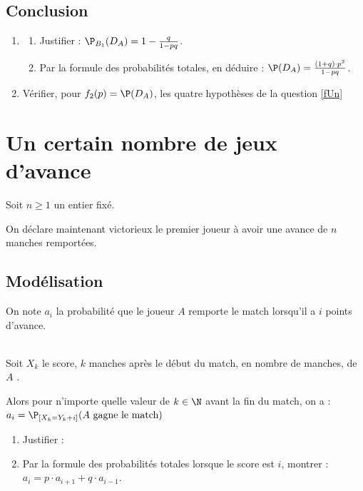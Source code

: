 \documentclass[12pt]{article}
\begin{document}
\subsection{Conclusion}
\begin{enumerate}[resume]
  \item
    \begin{enumerate}
      \item Justifier : \quad $\P_{B_1}(D_{A}) = 1-\frac{q}{1-pq}$.
      \item Par la formule des probabilités totales, en déduire : \quad $\P(D_{A}) = \frac{(1+q)\cdot p^2}{1-pq}$.
    \end{enumerate}
  \item Vérifier, pour $f_2(p) = \P(D_{A})$, les quatre hypothèses de la question \ref{fUn}
\end{enumerate}

\section{Un certain nombre de jeux d'avance}
Soit $n \ge 1$ un entier fixé.

On déclare maintenant victorieux le premier joueur à avoir une avance de $n$ manches remportées.
\subsection{Modélisation}

On note $a_i$ la probabilité  que le joueur $A$ remporte le match  lorsqu'il a $i$ points d'avance. \quad {}

\begin{example}~\\
  Soit $X_k$  le score, $k$ manches après le début du match, en nombre de manches, de $A$ .

  Alors pour n'importe quelle valeur de $k \in \N$ avant la fin du match, on a : \quad $a_i = \P_{[X_k=Y_k+i]}(A \text{ gagne le match})$
\end{example}

\begin{enumerate}[resume]
  \item Justifier : \quad 
    \moinsLigne
  \item
    Par la formule des probabilités totales lorsque le score est $i$, montrer : \quad $a_{i} = p \cdot a_{i+1} + q \cdot a_{i-1}$.
\end{enumerate}
\end{document}
